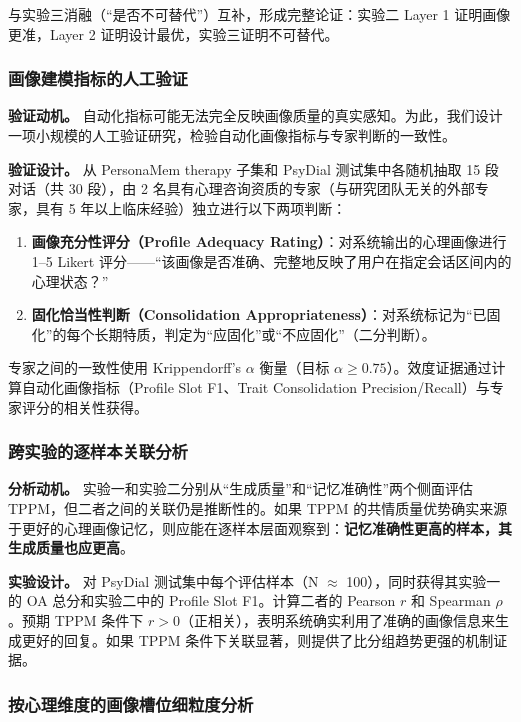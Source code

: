 \documentclass[12pt,a4paper]{article}
\newcommand{\methodname}{\textsc{TPPM}}
\begin{document}
与实验三消融（``是否不可替代''）互补，形成完整论证：实验二 Layer 1 证明画像更准，Layer 2 证明设计最优，实验三证明不可替代。

\subsubsection{画像建模指标的人工验证}
\label{sec:exp2_human_val}

\textbf{验证动机。} 自动化指标可能无法完全反映画像质量的真实感知。为此，我们设计一项小规模的人工验证研究，检验自动化画像指标与专家判断的一致性。

\textbf{验证设计。} 从 PersonaMem therapy 子集和 PsyDial 测试集中各随机抽取 15 段对话（共 30 段），由 2 名具有心理咨询资质的专家（与研究团队无关的外部专家，具有 5 年以上临床经验）独立进行以下两项判断：
\begin{enumerate}
  \item \textbf{画像充分性评分（Profile Adequacy Rating）}：对系统输出的心理画像进行 1--5 Likert 评分——``该画像是否准确、完整地反映了用户在指定会话区间内的心理状态？''
  \item \textbf{固化恰当性判断（Consolidation Appropriateness）}：对系统标记为``已固化''的每个长期特质，判定为``应固化''或``不应固化''（二分判断）。
\end{enumerate}
专家之间的一致性使用 Krippendorff's $\alpha$ 衡量（目标 $\alpha \geq 0.75$）。效度证据通过计算自动化画像指标（Profile Slot F1、Trait Consolidation Precision/Recall）与专家评分的相关性获得。

\subsubsection{跨实验的逐样本关联分析}

\textbf{分析动机。} 实验一和实验二分别从``生成质量''和``记忆准确性''两个侧面评估 TPPM，但二者之间的关联仍是推断性的。如果 TPPM 的共情质量优势确实来源于更好的心理画像记忆，则应能在逐样本层面观察到：\textbf{记忆准确性更高的样本，其生成质量也应更高}。

\textbf{实验设计。} 对 PsyDial 测试集中每个评估样本（N $\approx$ 100），同时获得其实验一的 OA 总分和实验二中的 Profile Slot F1。计算二者的 Pearson $r$ 和 Spearman $\rho$。预期 \methodname{} 条件下 $r > 0$（正相关），表明系统确实利用了准确的画像信息来生成更好的回复。如果 \methodname{} 条件下关联显著，则提供了比分组趋势更强的机制证据。

\subsubsection{按心理维度的画像槽位细粒度分析}
\end{document}
